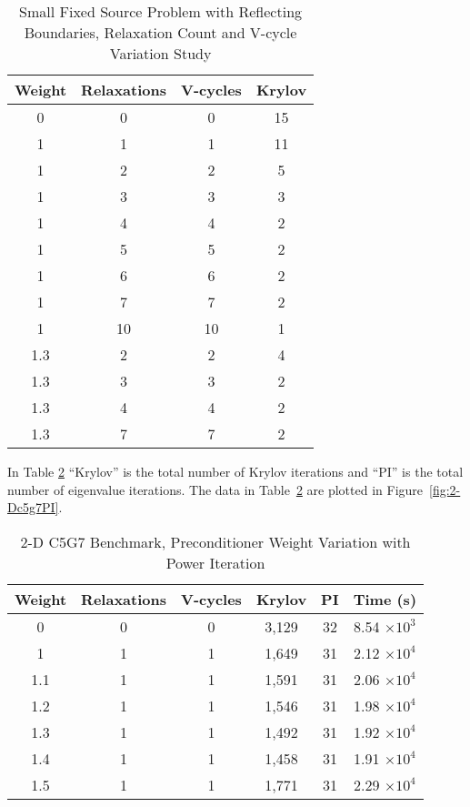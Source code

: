 \begin{table}[!h]
\caption{Small Fixed Source Problem with Reflecting Boundaries, Relaxation Count and V-cycle Variation Study}
\begin{center}
\begin{tabular}{|c |c |c |c|}
\hline
Weight & Relaxations & V-cycles & Krylov \\[0.5ex]
\hline
0  & 0 & 0 & 15 \\
1 & 1 & 1 & 11 \\
1 & 2 & 2 & 5 \\
1 & 3 & 3 & 3 \\
1 & 4 & 4 & 2 \\
1 & 5 & 5 & 2 \\
1 & 6 & 6 & 2 \\
1 & 7 & 7 & 2 \\
1 & 10 & 10 & 1 \\
\hline
1.3 & 2 & 2 & 4 \\
1.3 & 3 & 3 & 2 \\
1.3 & 4 & 4 & 2 \\
1.3 & 7 & 7 & 2 \\
\hline 
\end{tabular}
\end{center}
\label{table:FxdSrcTstReflRV}
\end{table}

In Table \ref{table:2-D c5g7} ``Krylov'' is the total number of Krylov iterations and ``PI'' is the total number of eigenvalue iterations. The data in Table~\ref{table:2-D c5g7} are plotted in Figure~\ref{fig:2-Dc5g7PI}.
%
\begin{table}[!h]
\caption{2-D C5G7 Benchmark, Preconditioner Weight Variation with Power Iteration}
\begin{center}
\begin{tabular}{|c |c |c |c |c |c|}
\hline
Weight & Relaxations & V-cycles & Krylov & PI & Time (s) \\[0.5ex]
\hline
0    & 0 & 0 & 3,129 & 32 & 8.54 $\times 10^{3}$ \\
1    & 1 & 1 & 1,649 & 31 & 2.12 $\times 10^{4}$ \\
1.1 & 1 & 1 & 1,591 & 31 & 2.06 $\times 10^{4}$ \\
1.2 & 1 & 1 & 1,546 & 31 & 1.98 $\times 10^{4}$ \\
1.3 & 1 & 1 & 1,492 & 31 & 1.92 $\times 10^{4}$ \\
1.4 & 1 & 1 & 1,458 & 31 & 1.91 $\times 10^{4}$ \\
1.5 & 1 & 1 & 1,771 & 31 & 2.29 $\times 10^{4}$ \\
\hline 
\end{tabular} 
\end{center}
\label{table:2-D c5g7}
\end{table}


